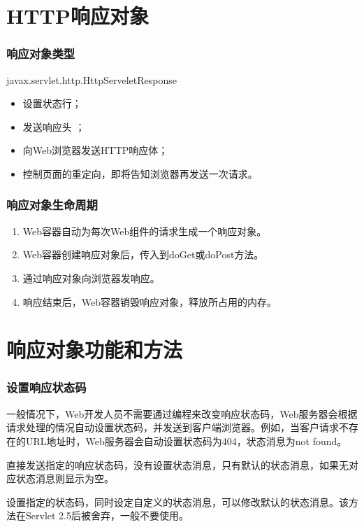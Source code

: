 \section{HTTP响应对象}

\begin{frame}[fragile] %
\frametitle{响应对象类型} 


javax.servlet.http.HttpServeletResponse


\begin{itemize}
\item 设置状态行；
\item 发送响应头 ；
\item 向Web浏览器发送HTTP响应体；
\item 控制页面的重定向，即将告知浏览器再发送一次请求。
\end{itemize}
\end{frame}

\begin{frame}[fragile] %
\frametitle{响应对象生命周期} 

\begin{enumerate}
\item Web容器自动为每次Web组件的请求生成一个响应对象。
\item Web容器创建响应对象后，传入到doGet或doPost方法。
\item 通过响应对象向浏览器发响应。
\item 响应结束后，Web容器销毁响应对象，释放所占用的内存。
\end{enumerate}

\end{frame}

\section{响应对象功能和方法}

\begin{frame}[fragile] %
\frametitle{设置响应状态码} 

一般情况下，Web开发人员不需要通过编程来改变响应状态码，Web服务器会根据请求处理的情况自动设置状态码，并发送到客户端浏览器。例如，当客户请求不存在的URL地址时，Web服务器会自动设置状态码为404，状态消息为not found。


直接发送指定的响应状态码，没有设置状态消息，只有默认的状态消息，如果无对应状态消息则显示为空。


设置指定的状态码，同时设定自定义的状态消息，可以修改默认的状态消息。该方法在Servlet 2.5后被舍弃，一般不要使用。

\end{frame}

